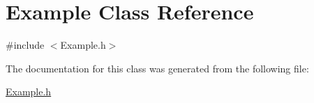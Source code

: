 \hypertarget{classExample}{
\section{Example Class Reference}
\label{classExample}
}


{\ttfamily \#include $<$Example.h$>$}



The documentation for this class was generated from the following file:\begin{DoxyCompactItemize}
\item 
\hyperlink{Example_8h}{Example.h}\end{DoxyCompactItemize}
